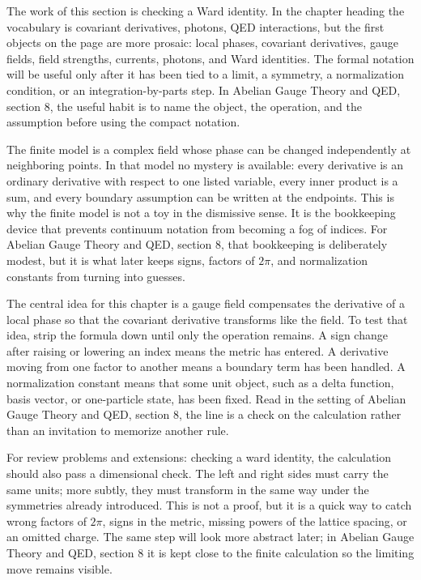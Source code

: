 The work of this section is checking a Ward identity.  In the chapter heading the vocabulary is covariant derivatives, photons, QED interactions, but the first objects on the page are more prosaic: local phases, covariant derivatives, gauge fields, field strengths, currents, photons, and Ward identities.  The formal notation will be useful only after it has been tied to a limit, a symmetry, a normalization condition, or an integration-by-parts step.  In Abelian Gauge Theory and QED, section 8, the useful habit is to name the object, the operation, and the assumption before using the compact notation.

The finite model is a complex field whose phase can be changed independently at neighboring points.  In that model no mystery is available: every derivative is an ordinary derivative with respect to one listed variable, every inner product is a sum, and every boundary assumption can be written at the endpoints.  This is why the finite model is not a toy in the dismissive sense.  It is the bookkeeping device that prevents continuum notation from becoming a fog of indices.  For Abelian Gauge Theory and QED, section 8, that bookkeeping is deliberately modest, but it is what later keeps signs, factors of \(2\pi\), and normalization constants from turning into guesses.

The central idea for this chapter is a gauge field compensates the derivative of a local phase so that the covariant derivative transforms like the field.  To test that idea, strip the formula down until only the operation remains.  A sign change after raising or lowering an index means the metric has entered.  A derivative moving from one factor to another means a boundary term has been handled.  A normalization constant means that some unit object, such as a delta function, basis vector, or one-particle state, has been fixed.  Read in the setting of Abelian Gauge Theory and QED, section 8, the line is a check on the calculation rather than an invitation to memorize another rule.

For review problems and extensions: checking a ward identity, the calculation should also pass a dimensional check.  The left and right sides must carry the same units; more subtly, they must transform in the same way under the symmetries already introduced.  This is not a proof, but it is a quick way to catch wrong factors of \(2\pi\), signs in the metric, missing powers of the lattice spacing, or an omitted charge.  The same step will look more abstract later; in Abelian Gauge Theory and QED, section 8 it is kept close to the finite calculation so the limiting move remains visible.

